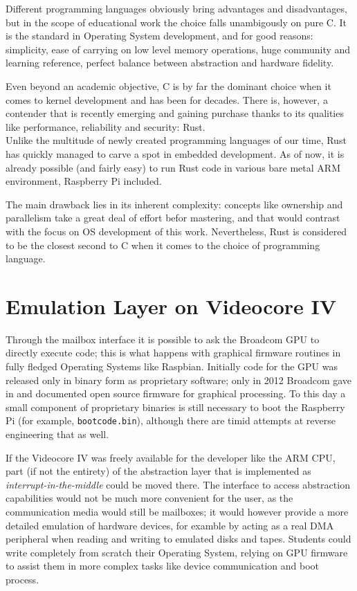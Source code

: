 \documentclass[12pt,a4paper,openright,twoside]{report}
\begin{document}
Different programming languages obviously bring advantages and disadvantages,
but in the scope of educational work the choice falls unambigously on pure C.
It is the standard in Operating System development, and for good reasons:
simplicity, ease of carrying on low level memory operations, huge community and
learning reference, perfect balance between abstraction and hardware fidelity.

Even beyond an academic objective, C is by far the dominant choice when it 
comes to kernel development and has been for decades. There is, however, a
contender that is recently emerging and gaining purchase thanks to its qualities
like performance, reliability and security: Rust.\\
Unlike the multitude of newly created programming languages of our time, Rust
has quickly managed to carve a spot in embedded development. As of now, it is 
already possible (and fairly easy) to run Rust code in various bare metal ARM
environment, Raspberry Pi included.

The main drawback lies in its inherent complexity: concepts like ownership and 
parallelism take a great deal of effort befor mastering, and that would contrast
with the focus on OS development of this work. Nevertheless, Rust is considered
to be the closest second to C when it comes to the choice of programming language.

\section{Emulation Layer on Videocore IV}
Through the mailbox interface it is possible to ask the Broadcom GPU to directly
execute code; this is what happens with graphical firmware routines in fully
fledged Operating Systems like Raspbian.
Initially code for the GPU was released only in binary form as proprietary 
software; only in 2012 Broadcom gave in and documented open source firmware for 
graphical processing. To this day a small component of proprietary binaries is 
still necessary to boot the Raspberry Pi (for example, {\tt bootcode.bin}), although
there are timid attempts at reverse engineering that as well.

If the Videocore IV was freely available for the developer like the ARM CPU, part
(if not the entirety) of the abstraction layer that is implemented as 
\textit{interrupt-in-the-middle} could be moved there. The interface to access
abstraction capabilities would not be much more convenient for the user, 
as the communication media would still be mailboxes; it would however provide
a more detailed emulation of hardware devices, for examble by acting as a real
DMA peripheral when reading and writing to emulated disks and tapes.
Students could write completely from scratch their Operating System, relying on 
GPU firmware to assist them in more complex tasks like device communication and
boot process.
\end{document}
